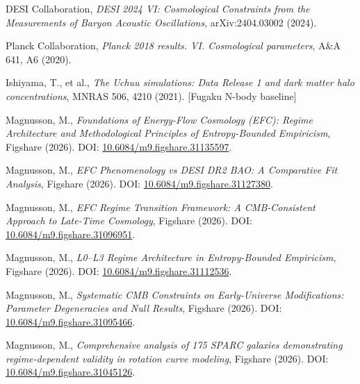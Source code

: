 \documentclass[12pt,a4paper]{article}
\begin{document}
\begin{enumerate}[leftmargin=2em,label={[\arabic*]},itemsep=0.3em]
    \item DESI Collaboration, \textit{DESI 2024 VI: Cosmological Constraints from the Measurements of Baryon Acoustic Oscillations}, arXiv:2404.03002 (2024).
    
    \item Planck Collaboration, \textit{Planck 2018 results. VI. Cosmological parameters}, A\&A 641, A6 (2020).
    
    \item Ishiyama, T., et al., \textit{The Uchuu simulations: Data Release 1 and dark matter halo concentrations}, MNRAS 506, 4210 (2021). [Fugaku N-body baseline]
    
    \item Magnusson, M., \textit{Foundations of Energy-Flow Cosmology (EFC): Regime Architecture and Methodological Principles of Entropy-Bounded Empiricism}, Figshare (2026). DOI: \href{https://doi.org/10.6084/m9.figshare.31135597}{10.6084/m9.figshare.31135597}.
    
    \item Magnusson, M., \textit{EFC Phenomenology vs DESI DR2 BAO: A Comparative Fit Analysis}, Figshare (2026). DOI: \href{https://doi.org/10.6084/m9.figshare.31127380}{10.6084/m9.figshare.31127380}.
    
    \item Magnusson, M., \textit{EFC Regime Transition Framework: A CMB-Consistent Approach to Late-Time Cosmology}, Figshare (2026). DOI: \href{https://doi.org/10.6084/m9.figshare.31096951}{10.6084/m9.figshare.31096951}.
    
    \item Magnusson, M., \textit{L0--L3 Regime Architecture in Entropy-Bounded Empiricism}, Figshare (2026). DOI: \href{https://doi.org/10.6084/m9.figshare.31112536}{10.6084/m9.figshare.31112536}.
    
    \item Magnusson, M., \textit{Systematic CMB Constraints on Early-Universe Modifications: Parameter Degeneracies and Null Results}, Figshare (2026). DOI: \href{https://doi.org/10.6084/m9.figshare.31095466}{10.6084/m9.figshare.31095466}.
    
    \item Magnusson, M., \textit{Comprehensive analysis of 175 SPARC galaxies demonstrating regime-dependent validity in rotation curve modeling}, Figshare (2026). DOI: \href{https://doi.org/10.6084/m9.figshare.31045126}{10.6084/m9.figshare.31045126}.
\end{enumerate}
\end{document}
